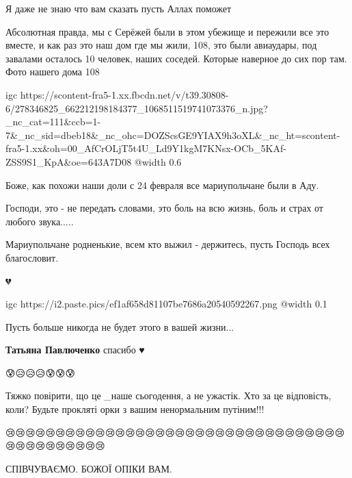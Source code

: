
Я даже не знаю что вам сказать пусть Аллах поможет


Абсолютная правда, мы с Серёжей были в этом убежище и пережили все это вместе, и
как раз это наш дом где мы жили, 108, это были авиаудары, под завалами осталось
10 человек, наших соседей. Которые наверное до сих пор там. Фото нашего дома
108

\ifcmt
  igc https://scontent-fra5-1.xx.fbcdn.net/v/t39.30808-6/278346825_662212198184377_1068511519741073376_n.jpg?_nc_cat=111&ccb=1-7&_nc_sid=dbeb18&_nc_ohc=DOZScsGE9YIAX9h3oXL&_nc_ht=scontent-fra5-1.xx&oh=00_AfCrOLjT5t4U_Ld9Y1kgM7KNsx-OCb_5KAf-ZSS9S1_KpA&oe=643A7D08
	@width 0.6
\fi


Боже, как похожи наши доли с 24 февраля все мариупольчане были в Аду.

Господи, это - не передать словами, это боль на всю жизнь, боль и страх от любого звука.....

Мариупольчане родненькие, всем кто выжил - держитесь, пусть Господь всех благословит.


💔


\ifcmt
  igc https://i2.paste.pics/ef1af658d81107be7686a20540592267.png
	@width 0.1
\fi


Пусть больше никогда не будет этого в вашей жизни...

\begin{itemize} %
\textbf{Татьяна Павлюченко} спасибо ♥️
\end{itemize} %


😰😥😥😥😰😰😰


Тяжко повірити, що це \_наше сьогодення, а не ужастік. Хто за це відповість,
коли? Будьте прокляті орки з вашим ненормальним путіним!!!


😢😢😢😢😢😢😢😢😢😢😢😢😢😢😢😢😢😢😢😢😢😢😢😢😢😢😢😢😢😢😢😢😢😢😢😢😢😢😢😢😢😢😢😢


СПІВЧУВАЄМО. БОЖОЇ ОПІКИ ВАМ.


